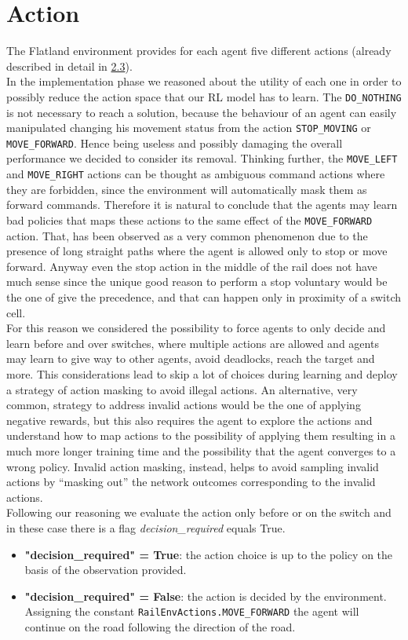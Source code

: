 \section{Action}
The Flatland environment provides for each agent five different actions (already described in detail in \hyperref[sec:envActions]{2.3}).\\
In the implementation phase we reasoned about the utility of each one in order to possibly reduce the action space that our RL model has to learn.
The \texttt{DO\_NOTHING} is not necessary to reach a solution, because the behaviour of an agent can easily manipulated changing his movement status from the action \texttt{STOP\_MOVING} or \texttt{MOVE\_FORWARD}. Hence being useless and possibly damaging the overall performance we decided to consider its removal. Thinking further, the \texttt{MOVE\_LEFT} and \texttt{MOVE\_RIGHT} actions can be thought as ambiguous command actions where they are forbidden, since the environment will automatically mask them as forward commands. Therefore it is natural to conclude that the agents may learn bad policies that maps these actions to the same effect of the \texttt{MOVE\_FORWARD} action. That, has been observed as a very common phenomenon due to the presence of long straight paths where the agent is allowed only to stop or move forward. Anyway even the stop action in the middle of the rail does not have much sense since the unique good reason to perform a stop voluntary would be the one of give the precedence, and that can happen only in proximity of a switch cell. \\
For this reason we considered the possibility to force agents to only decide and learn before and over switches, where multiple actions are allowed and agents may learn to give way to other agents, avoid deadlocks, reach the target and more. This considerations lead to skip a lot of choices during learning and deploy a strategy of action masking to avoid illegal actions.
An alternative, very common, strategy to address invalid actions would be the one of applying negative rewards, but this also requires the agent to explore the actions and understand how to map actions to the possibility of applying them resulting in a much more longer training time and the possibility that the agent converges to a wrong policy. Invalid action masking, instead, helps to avoid sampling invalid actions by “masking out” the network outcomes corresponding to the invalid actions. \\
Following our reasoning we evaluate the action only before or on the switch and in these case there is a flag \textit{decision\_required} equals True.
\begin{itemize}
\item \textbf{"decision\_required" = True}: the action choice is up to the policy on the basis of the observation provided.
\item \textbf{"decision\_required" = False}: the action is decided by the environment. Assigning the constant \texttt{RailEnvActions.MOVE\_FORWARD} the agent will continue on the road following the direction of the road.
\end{itemize}
